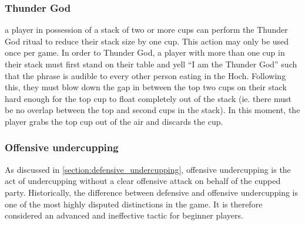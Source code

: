 \documentclass[12pt]{IEEEtran}
\begin{document}
\subsubsection{Thunder God} a player in possession of a stack of two or more cups can perform the Thunder God ritual to reduce their stack size by one cup. This action may only be used once per game. In order to Thunder God, a player with more than one cup in their stack must first stand on their table and yell ``I am the Thunder God'' such that the phrase is audible to every other person eating in the Hoch. Following this, they must blow down the gap in between the top two cups on their stack hard enough for the top cup to float completely out of the stack (ie. there must be no overlap between the top and second cups in the stack). In this moment, the player grabs the top cup out of the air and discards the cup.

\subsubsection{Offensive undercupping} As discussed in \ref{section:defensive_undercupping}, offensive undercupping is the act of undercupping without a clear offensive attack on behalf of the cupped party. Historically, the difference between defensive and offensive undercupping is one of the most highly disputed distinctions in the game. It is therefore considered an advanced and ineffective tactic for beginner players.
\end{document}
